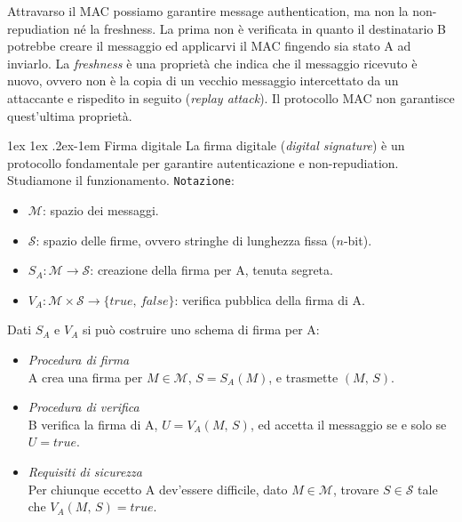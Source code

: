 \documentclass[a4paper, 11pt, notitlepage, fleqn]{report}
\makeatletter
\renewcommand{\paragraph}{%
	\@startsection{paragraph}{4}%
	{\z@}{1ex \@plus 1ex \@minus .2ex}{-1em}%
	{\normalfont\normalsize\bfseries}%
}
\makeatother
\begin{document}
Attravarso il MAC possiamo garantire message authentication, ma non la non-repudiation né la freshness. La prima non è verificata in quanto il destinatario B potrebbe creare il messaggio ed applicarvi il MAC fingendo sia stato A ad inviarlo. La \emph{freshness} è una proprietà che indica che il messaggio ricevuto è nuovo, ovvero non è la copia di un vecchio messaggio intercettato da un attaccante e rispedito in seguito (\emph{replay attack}). Il protocollo MAC non garantisce quest'ultima proprietà.

\paragraph{Firma digitale}
La firma digitale (\emph{digital signature}) è un protocollo fondamentale per garantire autenticazione e non-repudiation. Studiamone il funzionamento.
\texttt{Notazione}:
\begin{itemize}
	\item $\mathcal{M}$: spazio dei messaggi.
	\item $\mathcal{S}$: spazio delle firme, ovvero stringhe di lunghezza fissa ($n$-bit).
	\item $S_A\!:\mathcal{M}\rightarrow \mathcal{S}$: creazione della firma per A, tenuta segreta.
	\item $V_A\!: \mathcal{M}\times \mathcal{S}\rightarrow\{true,\,false\}$: verifica pubblica della firma di A.
\end{itemize}
Dati $S_A$ e $V_A$ si può costruire uno schema di firma per A:
\begin{itemize}
	\item \emph{Procedura di firma}\\
	A crea una firma per $M\in\mathcal{M}$, $S=S_A(M)$, e trasmette $(M,\,S)$.
	\item \emph{Procedura di verifica}\\
	B verifica la firma di A, $U=V_A(M,\,S)$, ed accetta il messaggio se e solo se $U=true$.
	\item \emph{Requisiti di sicurezza}\\
	Per chiunque eccetto A dev'essere difficile, dato $M\in\mathcal{M}$, trovare $S\in\mathcal{S}$ tale che $V_A(M,\,S)=true$.
\end{itemize}
\end{document}
